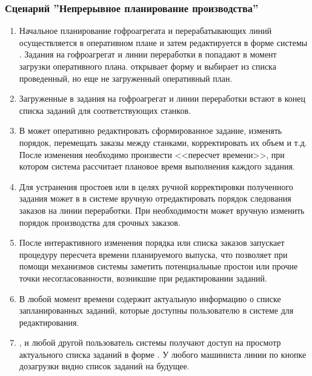 
\subsubsection{Сценарий ''Непрерывное планирование производства''}
\label{bp:plan_4}

\begin{enumerate}


\item Начальное планирование гофроагрегата и перерабатывающих линий осуществляется в оперативном плане и затем редактируется в форме  системы \gofro. Задания на гофроагрегат и линии переработки в  попадают в момент загрузки  \planner оперативного плана. \planner открывает форму  и выбирает из списка проведенный, но еще не загруженный оперативный план.
\item	Загруженные в  задания на гофроагрегат и линии переработки встают в конец списка заданий для соответствующих станков.
\item	В  \planner может оперативно редактировать сформированное задание, изменять порядок, перемещать заказы между станками, корректировать их объем и т.д. После изменения необходимо произвести <<пересчет времени>>, при котором система рассчитает плановое время выполнения каждого задания.
\item	Для устранения простоев или в целях ручной корректировки полученного задания \planner  может в  в системе \gofro вручную отредактировать порядок следования заказов на линии переработки. При необходимости \planner может вручную изменить порядок производства для срочных заказов.
\item	После интерактивного изменения порядка или списка заказов \planner запускает процедуру пересчета времени планируемого выпуска, что позволяет при помощи механизмов системы  \gofro заметить потенциальные простои или прочие точки несогласованности, возникшие при редактировании заданий.
\item	В любой момент времени  содержит актуальную информацию о списке запланированных заданий, которые доступны пользователю \planner в системе \gofro для редактирования.
\item	\master, \manager и любой другой пользователь системы \gofro получают доступ на просмотр актуального списка заданий в форме . У любого машиниста линии по кнопке дозагрузки видно список заданий на будущее.

\end{enumerate}
